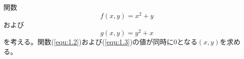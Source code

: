 \documentclass[a4j]{jsarticle}
\begin{document}
関数
\begin{equation}
    f(x, y) = x^2 + y \label{equ:1.2}
\end{equation}
および
\begin{equation}
    g(x, y) = y ^ 2 + x \label{equ:1.3}
\end{equation}
を考える。関数(\ref{equ:1.2})および(\ref{equ:1.3})の値が同時に0となる$(x, y)$を求める。
\end{document}
